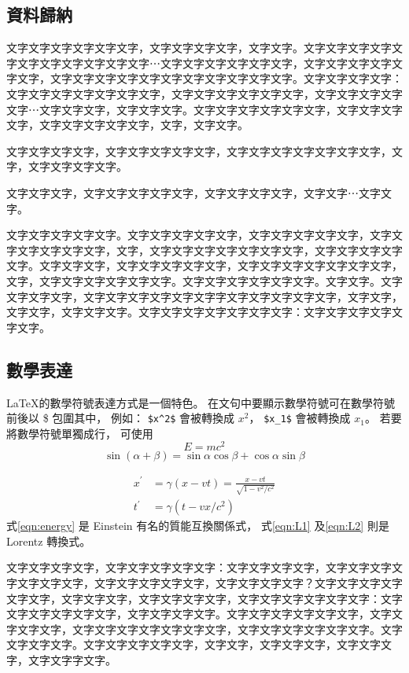 \documentclass[12pt]{article}
\begin{document}
\subsection{資料歸納}
文字文字文字文字文字文字，文字文字文字文字，文字文字。文字文字文字文字文字文字文字文字文字文字文字⋯文字文字文字文字文字文字，文字文字文字文字文字文字，文字文字文字文字文字文字文字文字文字文字文字。文字文字文字文字：文字文字文字文字文字文字文字，文字文字文字文字文字文字，文字文字文字文字文字⋯文字文字文字，文字文字文字。文字文字文字文字文字文字，文字文字文字文字，文字文字文字文字文字，文字，文字文字。

文字文字文字文字，文字文字文字文字文字，文字文字文字文字文字文字文字，文字，文字文字文字文字。

文字文字文字，文字文字文字文字文字，文字文字文字文字，文字文字⋯文字文字。

文字文字文字文字文字。文字文字文字文字文字，文字文字文字文字文字，文字文字文字文字文字文字，文字，文字文字文字文字文字文字文字，文字文字文字文字文字。文字文字文字，文字文字文字文字文字，文字文字文字文字文字文字文字，文字，文字文字文字文字文字文字。文字文字文字文字文字文字。文字文字。文字文字文字文字，文字文字文字文字文字文字字文字文字文字文字文字，文字文字，文字文字，文字文字文字。文字文字文字文字文字文字文字：文字文字文字文字文字文字。

\subsection{數學表達}
\LaTeX 的數學符號表達方式是一個特色。
在文句中要顯示數學符號可在數學符號前後以 \$ 包圍其中，
例如： \verb|$x^2$| 會被轉換成 $x^2$，
\verb|$x_1$| 會被轉換成 $x_1$。
若要將數學符號單獨成行，
可使用\autocite{einstein}
\begin{equation}
\label{eqn:energy}
E = mc^2 
\end{equation}
\begin{equation}
\sin(\alpha + \beta) = \sin \alpha \cos\beta + \cos \alpha \sin \beta
\end{equation}

\begin{align}
x^\prime  &= \gamma ( x - v t) = \frac{x - vt}{\sqrt{1 - v^2/c^2}} \label{eqn:L1}\\
t^\prime &= \gamma(t - vx/c^2)\label{eqn:L2}
\end{align}
式\ref{eqn:energy} 是 Einstein 有名的質能互換關係式\autocite{yang2006}，
式\ref{eqn:L1} 及\ref{eqn:L2} 則是 Lorentz 轉換式\autocite{阮2020}。


文字文字文字文字，文字文字文字文字文字：文字文字文字文字，文字文字文字文字文字文字文字，文字文字文字文字文字，文字文字文字文字？文字文字文字文字文字文字，文字文字文字，文字文字文字文字，文字文字文字文字文字文字：文字文字文字文字文字文字，文字文字文字文字。文字文字文字文字文字文字，文字文字文字文字，文字文字文字文字文字文字文字，文字文字文字文字文字文字。文字文字文字文字。文字文字文字文字文字，文字文字，文字文字文字，文字文字文字，文字文字字文字。
\end{document}
